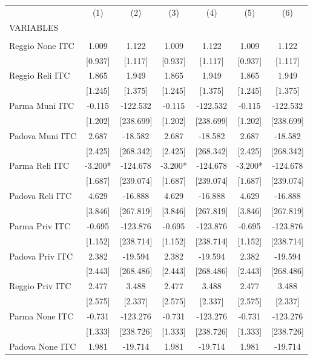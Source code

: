 \begin{tabular}{lcccccc} \hline
 & (1) & (2) & (3) & (4) & (5) & (6) \\
VARIABLES &  &  &  &  &  &  \\ \hline
 &  &  &  &  &  &  \\
Reggio None ITC & 1.009 & 1.122 & 1.009 & 1.122 & 1.009 & 1.122 \\
 & [0.937] & [1.117] & [0.937] & [1.117] & [0.937] & [1.117] \\
Reggio Reli ITC & 1.865 & 1.949 & 1.865 & 1.949 & 1.865 & 1.949 \\
 & [1.245] & [1.375] & [1.245] & [1.375] & [1.245] & [1.375] \\
Parma Muni ITC & -0.115 & -122.532 & -0.115 & -122.532 & -0.115 & -122.532 \\
 & [1.202] & [238.699] & [1.202] & [238.699] & [1.202] & [238.699] \\
Padova Muni ITC & 2.687 & -18.582 & 2.687 & -18.582 & 2.687 & -18.582 \\
 & [2.425] & [268.342] & [2.425] & [268.342] & [2.425] & [268.342] \\
Parma Reli ITC & -3.200* & -124.678 & -3.200* & -124.678 & -3.200* & -124.678 \\
 & [1.687] & [239.074] & [1.687] & [239.074] & [1.687] & [239.074] \\
Padova Reli ITC & 4.629 & -16.888 & 4.629 & -16.888 & 4.629 & -16.888 \\
 & [3.846] & [267.819] & [3.846] & [267.819] & [3.846] & [267.819] \\
Parma Priv ITC & -0.695 & -123.876 & -0.695 & -123.876 & -0.695 & -123.876 \\
 & [1.152] & [238.714] & [1.152] & [238.714] & [1.152] & [238.714] \\
Padova Priv ITC & 2.382 & -19.594 & 2.382 & -19.594 & 2.382 & -19.594 \\
 & [2.443] & [268.486] & [2.443] & [268.486] & [2.443] & [268.486] \\
Reggio Priv ITC & 2.477 & 3.488 & 2.477 & 3.488 & 2.477 & 3.488 \\
 & [2.575] & [2.337] & [2.575] & [2.337] & [2.575] & [2.337] \\
Parma None ITC & -0.731 & -123.276 & -0.731 & -123.276 & -0.731 & -123.276 \\
 & [1.333] & [238.726] & [1.333] & [238.726] & [1.333] & [238.726] \\
Padova None ITC & 1.981 & -19.714 & 1.981 & -19.714 & 1.981 & -19.714 \\

\end{tabular}
